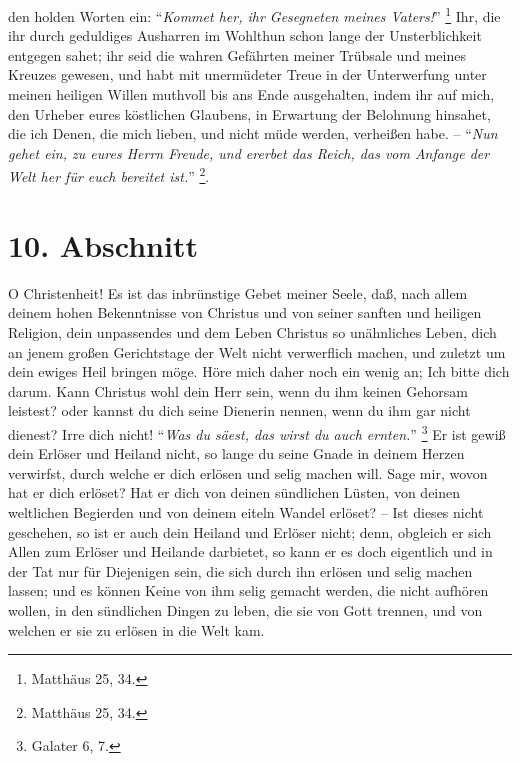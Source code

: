 den holden Worten ein:
"`\textit{Kommet her, ihr Gesegneten meines Vaters!}"' \footnote{Matthäus 25,
34.} 
Ihr, die ihr durch geduldiges Ausharren im Wohlthun schon lange der
Unsterblichkeit entgegen sahet;
ihr seid die wahren Gefährten meiner Trübsale und meines Kreuzes gewesen, und
habt mit unermüdeter Treue in der Unterwerfung unter meinen heiligen Willen
muthvoll bis ans Ende ausgehalten, indem ihr auf mich, den Urheber eures
köstlichen Glaubens, in Erwartung der Belohnung hinsahet, die ich Denen, die
mich lieben, und nicht müde werden, verheißen habe.
-- "`\textit{Nun gehet ein, zu eures Herrn Freude, und ererbet das Reich, das
vom Anfange der Welt her für euch bereitet ist.}"' \footnote{Matthäus 25, 34.}.

\section{10. Abschnitt} \label{kap1_ab10}

O Christenheit!
Es ist das inbrünstige Gebet meiner Seele, daß, nach allem deinem hohen
Bekenntnisse von Christus und von seiner sanften und heiligen Religion, dein
unpassendes und dem Leben Christus so unähnliches Leben, dich an jenem großen
Gerichtstage der Welt nicht verwerflich machen, und zuletzt um dein ewiges Heil
bringen möge.
Höre mich daher noch ein wenig an;
Ich bitte dich darum.
Kann Christus wohl dein Herr sein, wenn du ihm keinen Gehorsam leistest?
oder kannst du dich seine Dienerin nennen, wenn du ihm gar nicht dienest? Irre
dich nicht!
"`\textit{Was du säest, das wirst du auch ernten.}"' \footnote{Galater 6, 7.}
Er ist gewiß dein Erlöser und Heiland nicht, so lange du seine Gnade in deinem
Herzen verwirfst, durch welche er dich erlösen und selig machen will.
Sage mir, wovon hat er dich erlöset? 
Hat er dich von deinen sündlichen Lüsten, von deinen weltlichen Begierden und
von deinem eiteln Wandel erlöset?
-- Ist dieses nicht geschehen, so ist er auch dein Heiland und Erlöser nicht;
denn, obgleich er sich Allen zum Erlöser und Heilande darbietet, so kann er es
doch eigentlich und in der Tat nur für Diejenigen sein, die sich durch ihn
erlösen und selig machen lassen;
und es können Keine von ihm selig gemacht werden, die nicht aufhören wollen, in
den sündlichen Dingen zu leben, die sie von Gott trennen, und von welchen er sie
zu erlösen in die Welt kam.

